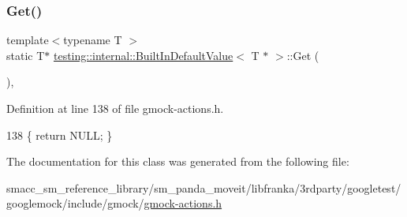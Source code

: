 \subsubsection{\texorpdfstring{Get()}{Get()}}
{\footnotesize\ttfamily template$<$typename T $>$ \\
static T$\ast$ \hyperlink{classtesting_1_1internal_1_1BuiltInDefaultValue}{testing\+::internal\+::\+Built\+In\+Default\+Value}$<$ T $\ast$ $>$\+::Get (\begin{DoxyParamCaption}{ }\end{DoxyParamCaption})\hspace{0.3cm}{\ttfamily [inline]}, {\ttfamily [static]}}



Definition at line 138 of file gmock-\/actions.\+h.


\begin{DoxyCode}
138 \{ \textcolor{keywordflow}{return} NULL; \}
\end{DoxyCode}


The documentation for this class was generated from the following file\+:\begin{DoxyCompactItemize}
\item 
smacc\+\_\+sm\+\_\+reference\+\_\+library/sm\+\_\+panda\+\_\+moveit/libfranka/3rdparty/googletest/googlemock/include/gmock/\hyperlink{gmock-actions_8h}{gmock-\/actions.\+h}\end{DoxyCompactItemize}
